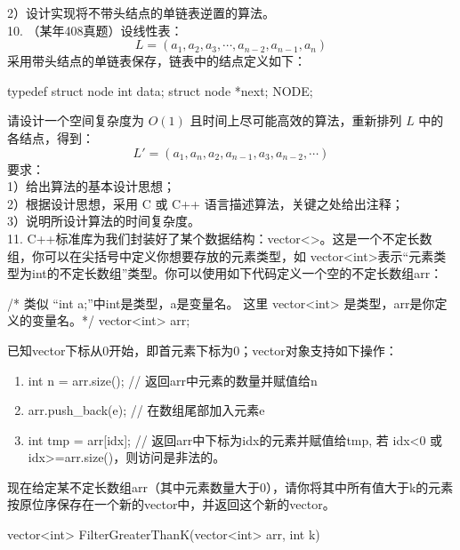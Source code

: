 \begin{exercise}
2）设计实现将不带头结点的单链表逆置的算法。\\


10. （某年408真题）设线性表：
$$ L=(a_1,a_2,a_3,\cdots,a_{n-2},a_{n-1},a_n) $$
采用带头结点的单链表保存，链表中的结点定义如下：
\begin{cppcode}
    typedef struct node
    {
        int data;
        struct node *next;
    }NODE;
\end{cppcode}

请设计一个空间复杂度为 \(O(1)\) 且时间上尽可能高效的算法，重新排列 \(L\) 中的各结点，得到：
$$ L'=(a_1,a_n,a_2,a_{n-1},a_3,a_{n-2},\cdots) $$
要求：\\
1）给出算法的基本设计思想；\\
2）根据设计思想，采用 C 或 C++ 语言描述算法，关键之处给出注释；\\
3）说明所设计算法的时间复杂度。\\


11. C++标准库为我们封装好了某个数据结构：vector<>。这是一个不定长数组，你可以在尖括号中定义你想要存放的元素类型，如
vector<int>表示“元素类型为int的不定长数组”类型。你可以使用如下代码定义一个空的不定长数组arr：
\begin{cppcode}
    /* 类似 “int a;”中int是类型，a是变量名。
    这里 vector<int> 是类型，arr是你定义的变量名。*/
    vector<int> arr;   
\end{cppcode}
已知vector下标从0开始，即首元素下标为0；vector对象支持如下操作：
\begin{enumerate}[label=\arabic*）]
    \item int n = arr.size();   // 返回arr中元素的数量并赋值给n
    \item arr.push\_back(e); // 在数组尾部加入元素e
    \item int tmp = arr[idx]; // 返回arr中下标为idx的元素并赋值给tmp, 若 idx<0 或 idx>=arr.size()，则访问是非法的。
\end{enumerate}

现在给定某不定长数组arr（其中元素数量大于0），请你将其中所有值大于k的元素按原位序保存在一个新的vector中，并返回这个新的vector。
\begin{cppcode}
    vector<int> FilterGreaterThanK(vector<int> arr, int k) {

    }
\end{cppcode}



\end{exercise}
\clearpage


